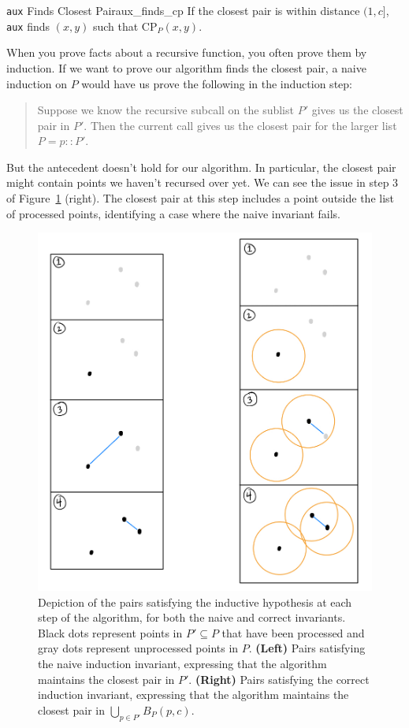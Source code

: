 \documentclass{article}
\begin{document}
\begin{tcblemma}{{\large\texttt{aux}} Finds Closest Pair}{aux_finds_cp}
If the closest pair is within distance $(1, c]$, \texttt{aux} finds $(x, y)$ such that $\text{CP}_P(x, y)$.
\end{tcblemma}

When you prove facts about a recursive function, you often prove them by induction.
If we want to prove our algorithm finds the closest pair, a naive induction on $P$ would have us prove the following in the induction step:
\begin{quote}
  Suppose we know the recursive subcall on the sublist $P'$ gives us the closest pair in $P'$.
  Then the current call gives us the closest pair for the larger list $P = p :: P'$.
\end{quote}
But the antecedent doesn't hold for our algorithm.
In particular, the closest pair might contain points we haven't recursed over yet.
We can see the issue in step 3 of Figure~\ref{fig:aux_invariant} (right).
The closest pair at this step includes a point outside the list of processed points, identifying a case where the naive invariant fails.
\begin{figure}[H]\label{fig:aux_invariant}
  \begin{center}
  \includegraphics[width=0.5\linewidth]{res/aux_invariant}
  \end{center}
  \caption{
    Depiction of the pairs satisfying the inductive hypothesis at each step of the algorithm, for both the naive and correct invariants.
    Black dots represent points in $P' \subseteq P$ that have been processed and gray dots represent unprocessed points in $P$.
    \textbf{(Left)}
      Pairs satisfying the naive induction invariant, expressing that the algorithm maintains the closest pair in $P'$.
    \textbf{(Right)}
      Pairs satisfying the correct induction invariant, expressing that the algorithm maintains the closest pair in $\bigcup_{p \in P'}B_P(p, c)$.
  }
\end{figure}
\end{document}
